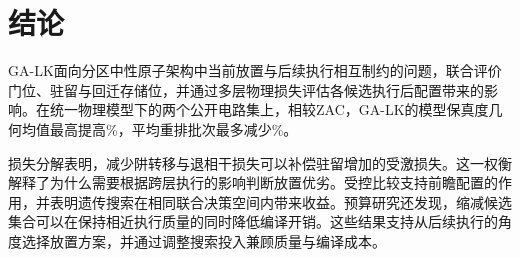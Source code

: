 \section{结论}
\label{sec:discussion}
\label{sec:conclusion}

GA-LK面向分区中性原子架构中当前放置与后续执行相互制约的问题，联合评价门位、驻留与回迁存储位，并通过多层物理损失评估各候选执行后配置带来的影响。在统一物理模型下的两个公开电路集上，相较ZAC，GA-LK的模型保真度几何均值最高提高\GAMainMaxDatasetFidelityGain\%，平均重排批次最多减少\GAMainMaxDatasetBatchReduction\%。

损失分解表明，减少阱转移与退相干损失可以补偿驻留增加的受激损失。这一权衡解释了为什么需要根据跨层执行的影响判断放置优劣。受控比较支持前瞻配置的作用，并表明遗传搜索在相同联合决策空间内带来收益。预算研究还发现，缩减候选集合可以在保持相近执行质量的同时降低编译开销。这些结果支持从后续执行的角度选择放置方案，并通过调整搜索投入兼顾质量与编译成本。
